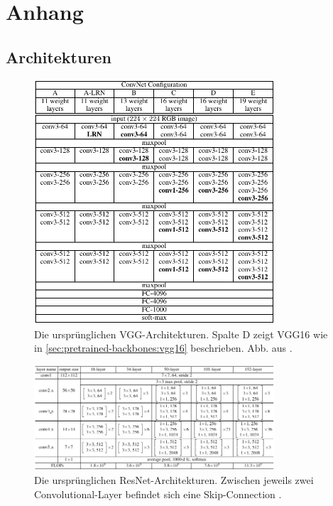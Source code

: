 \chapter{Anhang}

\section{Architekturen}

\begin{figure}
	\centering
	\includegraphics[width=0.8\textwidth]{Bilder/vgg16-architecture.pdf} 
	\caption{Die ursprünglichen VGG-Architekturen. Spalte D zeigt VGG16 wie in \autoref{sec:pretrained-backbones:vgg16} beschrieben. Abb. aus \cite{Simonyan.04092014}.}
	\label{fig:vgg16-architecture}
\end{figure} 

\begin{figure}
	\centering
	\includegraphics[width=0.8\textwidth]{Bilder/resnet34-architecture.pdf} 
	\caption{Die ursprünglichen ResNet-Architekturen. Zwischen jeweils zwei Convolutional-Layer befindet sich eine Skip-Connection \cite{He.10122015}.}
	\label{fig:resnet34-architecture}
\end{figure} 

